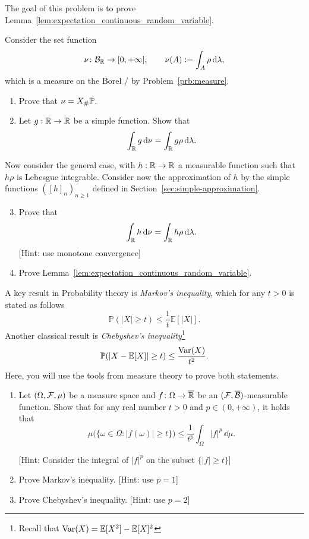\begin{problem}\label{prb:expectation_continuous_random_variable}
The goal of this problem is to prove Lemma~\ref{lem:expectation_continuous_random_variable}. 

Consider the set function
\[
	\nu\colon \mathcal B_{\mathbb R} \to [0,+\infty],\qquad\nu(A) := \int_A \rho\, \mathrm{d} \lambda,
\]
which is a measure on the Borel \sigalg/ by Problem~\ref{prb:measure}.
\begin{enumerate}[label=(\alph*)]
\item Prove that $\nu = X_\# \mathbb P$.
\item Let $g : \mathbb R \to \mathbb R$ be a simple function. Show that
\[
	\int_{\mathbb R} g \, \mathrm{d} \nu = \int_{\mathbb R} g \rho \, \mathrm{d} \lambda.
\]
\end{enumerate}

Now consider the general case, with $h : \mathbb R \to \mathbb R$ a measurable function such that $h \rho$ is Lebesgue integrable. Consider now the approximation of $h$ by the simple functions $([h]_n)_{n \ge 1}$ defined in Section~\ref{sec:simple-approximation}.
\begin{enumerate}[label=(\alph*)]
\setcounter{enumi}{2}
\item Prove that 
\[
	\int_{\mathbb R} h \, \mathrm{d} \nu = \int_{\mathbb R} h \rho \, \mathrm{d} \lambda.
\]
[Hint: use monotone convergence]
\item Prove Lemma~\ref{lem:expectation_continuous_random_variable}.
\end{enumerate}
\end{problem}

\begin{problem}\label{prb:markov_chebyshev}
A key result in Probability theory is \emph{Markov's inequality}, which for any $t>0$ is stated as follows
\[
	\mathbb{P}(|X| \geq t) \leq \frac{1}{t} \mathbb{E}[|X|].
\]
Another classical result is \emph{Chebyshev's inequality}\footnote{Recall that $\mathrm{Var}(X) = \mathbb E[X^2] - \mathbb E[X]^2$}
\[
	\mathbb P(|X - \mathbb E[X]| \ge t) \le \frac{\mathrm{Var}(X)}{t^2}.
\]
Here, you will use the tools from measure theory to prove both statements.
\begin{enumerate}[label=(\alph*)]
\item Let $(\Omega,\mathcal F,\mu)$ be a measure space and $f\colon \Omega\to \overline{\mathbb R}$ be an $(\mathcal F,\overline{\mathcal B})$-measurable function. Show that for any real number $t>0$ and $p\in(0,+\infty)$, it holds that
\[
	\mu\bigl(\{\omega\in\Omega : |f(\omega)|\ge t\}\bigr) \le \frac{1}{t^p}\int_\Omega |f|^p\,\dd\mu.
\]

[Hint: Consider the integral of $|f|^p$ on the subset $\{|f|\ge t\}$]
\item Prove Markov's inequality. [Hint: use $p = 1$]
\item Prove Chebyshev's inequality. [Hint: use $p = 2$]
\end{enumerate}
\end{problem}

\begin{problem}\label{prb:construction_multivatiate_rv}

\end{problem}
